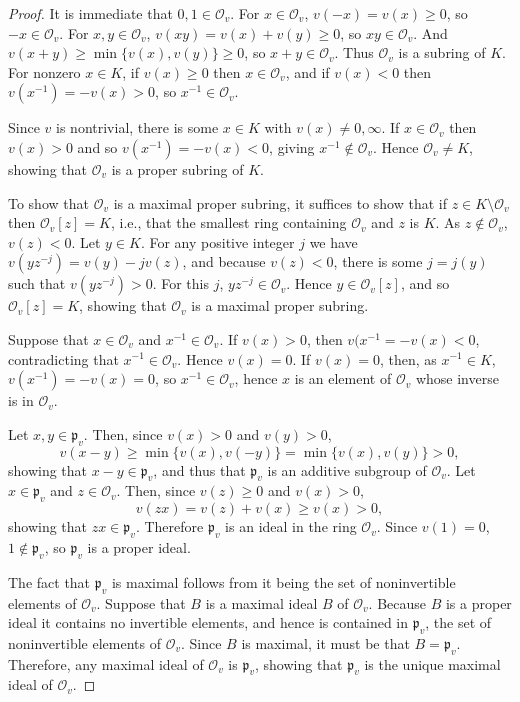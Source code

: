 \documentclass{article}
\theoremstyle{definition}
\begin{document}
\begin{proof}
It is immediate that $0,1 \in \mathcal{O}_v$. For $x \in \mathcal{O}_v$, $v(-x)=v(x) \geq 0$, so
$-x \in \mathcal{O}_v$. For $x,y \in \mathcal{O}_v$, $v(xy)=v(x)+v(y) \geq 0$, so $xy \in \mathcal{O}_v$. 
And
$v(x+y) \geq \min\{v(x),v(y)\} \geq 0$, so $x+y \in \mathcal{O}_v$.
Thus
$\mathcal{O}_v$ is a subring of $K$. 
For nonzero $x \in K$, if $v(x) \geq 0$ then $x \in \mathcal{O}_v$, and if
$v(x)<0$ then $v(x^{-1})=-v(x)>0$, so $x^{-1} \in \mathcal{O}_v$.

Since $v$ is nontrivial, there is some $x \in K$ with $v(x) \neq 0, \infty$. If $x \in \mathcal{O}_v$ then
$v(x)>0$ and
so $v(x^{-1})=-v(x)<0$, giving $x^{-1} \not \in \mathcal{O}_v$. Hence $\mathcal{O}_v \neq K$, showing
that $\mathcal{O}_v$ is a proper subring of $K$. 

To show that $\mathcal{O}_v$ is a maximal proper subring, it suffices to show that
if $z \in K \setminus \mathcal{O}_v$ then $\mathcal{O}_v[z] = K$, i.e., that the smallest ring containing
$\mathcal{O}_v$ and $z$ is $K$. As $z \not \in \mathcal{O}_v$, $v(z)<0$.
Let $y \in K$. For any positive integer $j$ we have $v(y z^{-j})=v(y)-jv(z)$, and because
$v(z)<0$, there is some
$j=j(y)$ such that $v(yz^{-j})>0$. For this $j$, $yz^{-j} \in \mathcal{O}_v$. Hence
$y \in \mathcal{O}_v[z]$, and so $\mathcal{O}_v[z] = K$, showing that $\mathcal{O}_v$ is a maximal
proper subring.

Suppose that $x \in \mathcal{O}_v$ and $x^{-1} \in \mathcal{O}_v$. If $v(x)>0$, then
$v(x^{-1}=-v(x)<0$, contradicting that $x^{-1} \in \mathcal{O}_v$. Hence $v(x)=0$. 
If $v(x)=0$, then, as $x^{-1} \in K$, $v(x^{-1})=-v(x)=0$, so $x^{-1} \in \mathcal{O}_v$, hence
$x$ is an element of $\mathcal{O}_v$ whose inverse is in $\mathcal{O}_v$.

Let $x,y \in  \mathfrak{p}_v$. Then, since $v(x)>0$ and $v(y)>0$,
\[
v(x-y) \geq \min\{v(x),v(-y)\}=
\min\{v(x),v(y)\} >0,
\]
showing that $x-y \in \mathfrak{p}_v$, and thus that $\mathfrak{p}_v$ is an additive subgroup
of $\mathcal{O}_v$. Let $x \in \mathfrak{p}_v$ and $z \in \mathcal{O}_v$.  
Then, since $v(z) \geq 0$ and $v(x)>0$,
\[
v(zx)=v(z)+v(x) \geq v(x)>0,
\]
showing that $zx \in \mathfrak{p}_v$. Therefore $\mathfrak{p}_v$ is an ideal in the ring
$\mathcal{O}_v$. Since $v(1)=0$, $1 \not \in \mathfrak{p}_v$, so $\mathfrak{p}_v$ is a proper
ideal. 

The fact that $\mathfrak{p}_v$ is maximal follows from it being the set of noninvertible elements
of $\mathcal{O}_v$. Suppose that $B$ is a maximal ideal $B$ of
$\mathcal{O}_v$.  Because $B$ is a proper ideal it contains
no invertible elements, and hence is contained in $\mathfrak{p}_v$, the set of noninvertible
elements of $\mathcal{O}_v$. Since $B$ is maximal, it must be that $B=\mathfrak{p}_v$.
Therefore, any maximal ideal of $\mathcal{O}_v$ is $\mathfrak{p}_v$, showing that
$\mathfrak{p}_v$ is the unique maximal ideal of $\mathcal{O}_v$.
\end{proof}
\end{document}
